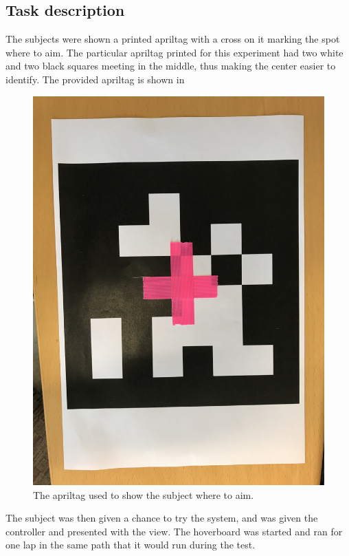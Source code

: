 \documentclass[nofilelist]{cslthse-msc}
\begin{document}
\subsection{Task description}
The subjects were shown a printed apriltag with a cross on it marking the spot where to aim. The particular apriltag printed for this experiment had two white and two black squares meeting in the middle, thus making the center easier to identify. The provided apriltag is shown in 

\begin{figure}[!hbt]
   \centering
   \includegraphics[scale=0.08]{images/apriltag.jpg} 
   \caption{The apriltag used to show the subject where to aim.}
   \label{fig:apriltag}
\end{figure}

The subject was then given a chance to try the system, and was given the controller and presented with the view. The hoverboard was started and ran for one lap in the same path that it would run during the test.
\end{document}
